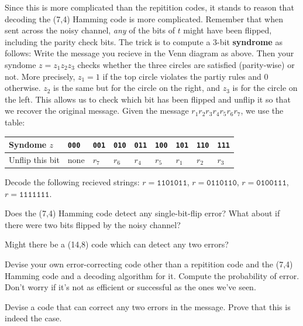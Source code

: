 \documentclass{article}
\begin{document}
Since this is more complicated than the repitition codes, it stands to reason that decoding the (7,4) Hamming code is more complicated.
Remember that when sent across the noisy channel, \textit{any} of the bits of \(t\) might have been flipped, including the parity check bits.
The trick is to compute a 3-bit \textbf{syndrome} as follows:
Write the message you recieve in the Venn diagram as above.
Then your syndome \(z = z_1z_2z_3\) checks whether the three circles are satisfied (parity-wise) or not.
More precisely, \(z_1=1\) if the top circle violates the partiy rules and 0 otherwise. \(z_2\) is the same but for the circle on the right, and \(z_3\) is for the circle on the left.
This allows us to check which bit has been flipped and unflip it so that we recover the original message.
Given the message \(r_1r_2r_3r_4r_5r_6r_7\), we use the table:
\begin{table}[h!]
    \begin{center}
        \begin{tabular}{l|llllllll}
            Syndome \(z\) &\texttt{000} &\texttt{001} &\texttt{010} &\texttt{011} &\texttt{100} &\texttt{101} &\texttt{110} &\texttt{111} \\\hline
            Unflip this bit & none & \(r_7\) & \(r_6\) & \(r_4\) & \(r_5\) & \(r_1\) & \(r_2\) & \(r_3\)
        \end{tabular}
    \end{center}
\end{table}

\begin{exercise}
    Decode the following recieved strings: \(r = \texttt{1101011}\), \(r = \texttt{0110110}\), \(r = \texttt{0100111}\), \(r = \texttt{1111111}\).
\end{exercise}

\begin{exercise}
    Does the (7,4) Hamming code detect any single-bit-flip error? 
    What about if there were two bits flipped by the noisy channel? 
\end{exercise}

\begin{exercise}
    Might there be a (14,8) code which can detect any two errors?
\end{exercise}

\begin{exercise}
    Devise your own error-correcting code other than a repitition code and the (7,4) Hamming code and a decoding algorithm for it.
    Compute the probability of error.
    Don't worry if it's not as efficient or successful as the ones we've seen.
\end{exercise}

\begin{exercise}
    Devise a code that can correct any two errors in the message.
    Prove that this is indeed the case.
\end{exercise}
\end{document}
